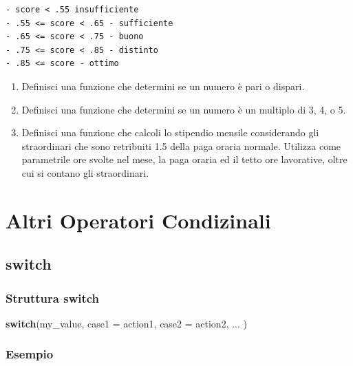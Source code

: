 \documentclass[
]{book}
\newenvironment{Shaded}{\begin{snugshade}}{\end{snugshade}}
\newcommand{\ControlFlowTok}[1]{\textcolor[rgb]{0.13,0.29,0.53}{\textbf{#1}}}
\newcommand{\DataTypeTok}[1]{\textcolor[rgb]{0.13,0.29,0.53}{#1}}
\newcommand{\NormalTok}[1]{#1}
\providecommand{\tightlist}{%
  \setlength{\itemsep}{0pt}\setlength{\parskip}{0pt}}
\begin{document}
\begin{verbatim}
- score < .55 insufficiente
- .55 <= score < .65 - sufficiente
- .65 <= score < .75 - buono
- .75 <= score < .85 - distinto
- .85 <= score - ottimo
\end{verbatim}

\begin{enumerate}
\def\labelenumi{\arabic{enumi}.}
\setcounter{enumi}{1}
\tightlist
\item
  Definisci una funzione che determini se un numero è pari o dispari.
\item
  Definisci una funzione che determini se un numero è un multiplo di 3, 4, o 5.
\item
  Definisci una funzione che calcoli lo stipendio mensile considerando gli straordinari che sono retribuiti 1.5 della paga oraria normale. Utilizza come parametrile ore svolte nel mese, la paga oraria ed il tetto ore lavorative, oltre cui si contano gli straordinari.
\end{enumerate}

\hypertarget{altri-operatori-condizinali}{%
\section{Altri Operatori Condizinali}\label{altri-operatori-condizinali}}

\hypertarget{switch}{%
\subsection{switch}\label{switch}}

\hypertarget{struttura-switch}{%
\subsubsection*{Struttura switch}\label{struttura-switch}}

\begin{Shaded}
\begin{Highlighting}[]

\ControlFlowTok{switch}\NormalTok{(my_value,}
       \DataTypeTok{case1 =}\NormalTok{ action1,}
       \DataTypeTok{case2 =}\NormalTok{ action2,}
\NormalTok{       ... )}
\end{Highlighting}
\end{Shaded}

\hypertarget{esempio-3}{%
\subsubsection*{Esempio}\label{esempio-3}}
\end{document}
